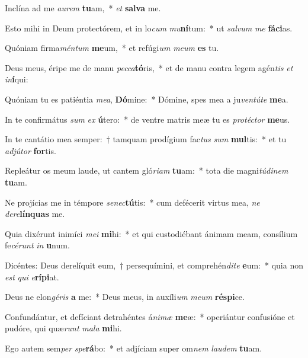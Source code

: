 \item Inclína ad me \textit{au}\textit{rem} \textbf{tu}am,~* \textit{et} \textbf{sal}\textbf{va} me.
\item Esto mihi in Deum protectórem, et in lo\textit{cum} \textit{mu}\textbf{ní}tum:~* ut \textit{sal}\textit{vum} \textit{me} \textbf{fá}\textbf{ci}as.
\item Quóniam firma\textit{mén}\textit{tum} \textbf{me}um,~* et refúgi\textit{um} \textit{me}\textit{um} \textbf{es} tu.
\item Deus meus, éripe me de manu \textit{pec}\textit{ca}\textbf{tó}ris,~* et de manu contra legem agén\textit{tis} \textit{et} \textit{in}\textbf{í}qui:
\item Quóniam tu es patiéntia \textit{me}\textit{a}, \textbf{Dó}mine:~* Dómine, spes mea a ju\textit{ven}\textit{tú}\textit{te} \textbf{me}a.
\item In te confirmátus \textit{sum} \textit{ex} \textbf{ú}tero:~* de ventre matris meæ tu es \textit{pro}\textit{téc}\textit{tor} \textbf{me}us.
\item In te cantátio mea semper:~† tamquam prodígium fac\textit{tus} \textit{sum} \textbf{mul}tis:~* et tu \textit{ad}\textit{jú}\textit{tor} \textbf{for}tis.
\item Repleátur os meum laude, ut cantem gló\textit{ri}\textit{am} \textbf{tu}am:~* tota die magni\textit{tú}\textit{di}\textit{nem} \textbf{tu}am.
\item Ne projícias me in témpore \textit{se}\textit{nec}\textbf{tú}tis:~* cum defécerit virtus mea, \textit{ne} \textit{de}\textit{re}\textbf{lín}\textbf{quas} me.
\item Quia dixérunt inimíci \textit{me}\textit{i} \textbf{mi}hi:~* et qui custodiébant ánimam meam, consílium fe\textit{cé}\textit{runt} \textit{in} \textbf{u}num.
\item Dicéntes: Deus derelíquit eum,~† persequímini, et comprehén\textit{di}\textit{te} \textbf{e}um:~* quia non \textit{est} \textit{qui} \textit{e}\textbf{rí}\textbf{pi}at.
\item Deus ne elon\textit{gé}\textit{ris} \textbf{a} me:~* Deus meus, in auxíli\textit{um} \textit{me}\textit{um} \textbf{ré}\textbf{spi}ce.
\item Confundántur, et defíciant detrahéntes á\textit{ni}\textit{mæ} \textbf{me}æ:~* operiántur confusióne et pudóre, qui quæ\textit{runt} \textit{ma}\textit{la} \textbf{mi}hi.
\item Ego autem sem\textit{per} \textit{spe}\textbf{rá}bo:~* et adjíciam super om\textit{nem} \textit{lau}\textit{dem} \textbf{tu}am.
